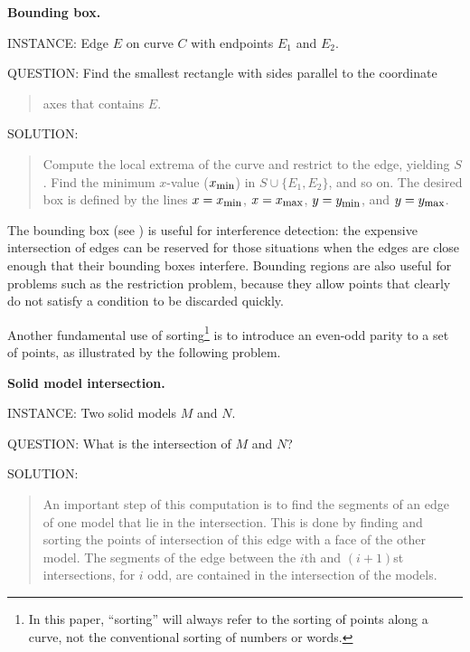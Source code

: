 {\bf Bounding box.}

INSTANCE: Edge $E$ on curve $C$ with endpoints $E_{1}$ and $E_{2}$.

QUESTION: Find the smallest rectangle with sides parallel to the coordinate
\begin{quote}
axes that contains $E$.
\end{quote}

SOLUTION: 
\begin{quote}
Compute the local extrema of the curve and restrict to the edge, 
yielding $S$.
Find the minimum $x$-value ($x_{\mbox{\footnotesize{min}}}$) 
in $S \cup \{E_{1},E_{2}\}$, and so on.
The desired box is defined by the lines 
$x = x_{\mbox{\footnotesize{min}}}$, 
$x = x_{\mbox{\footnotesize{max}}}$, $y = y_{\mbox{\footnotesize{min}}}$, 
and $y = y_{\mbox{\footnotesize{max}}}$.
\end{quote}
\vspace{.25in}

The bounding box (see \cite[p. 372]{NS}) is useful for interference 
detection: 
the expensive intersection of edges can be reserved for those situations 
when the edges
are close enough that their bounding boxes interfere.
Bounding regions are also useful for problems such as the 
restriction problem, 
because they allow points that clearly do not satisfy a condition to 
be discarded
quickly.

Another fundamental use of sorting\footnote{In this paper, 
	``sorting'' will always
	refer to the sorting of points along a curve, not the conventional 
	sorting of 
	numbers or words.} 
is to introduce an even-odd parity to a
set of points, as illustrated by the following problem.

\vspace{.2in}

{\bf Solid model intersection.}

INSTANCE: Two solid models $M$ and $N$.

QUESTION: What is the intersection of $M$ and $N$?

SOLUTION: 
\begin{quote}
An important step of this computation
is to find the segments of an edge of one model that lie in the 
intersection.
This is done by finding and sorting the points of intersection 
of this edge with a face of the other model. 
The segments of the edge between the $i$th and $(i+1)$st intersections,
for $i$ odd, are contained in the intersection of the models.
\end{quote}

